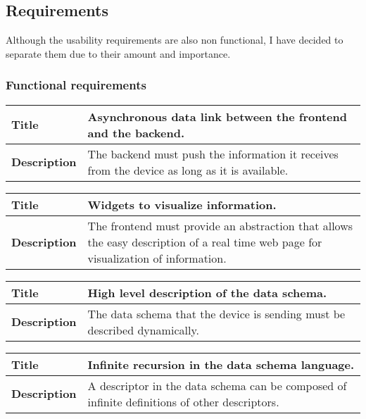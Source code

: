 \documentclass[12pt]{article}
\begin{document}
        \subsection{Requirements}
            Although the usability requirements are also non functional, I have
            decided to separate them due to their amount and importance.

            \subsubsection{Functional requirements}
                \setlength{\parindent}{0cm}
                \begin{tabularx}{\textwidth}{|l|X|}
                    \hline
                    \textbf{Title} & Asynchronous data link between the frontend
                    and the backend. \\
                    \hline
                    \textbf{Description} & The backend must push the information
                    it receives from the device as long as it is available. \\
                    \hline
                \end{tabularx}

                \begin{tabularx}{\textwidth}{|l|X|}
                    \hline
                    \textbf{Title} & Widgets to visualize information. \\
                    \hline
                    \textbf{Description} & The frontend must provide an
                    abstraction that allows the easy description of a real time
                    web page for visualization of information. \\
                    \hline
                \end{tabularx}

                \begin{tabularx}{\textwidth}{|l|X|}
                    \hline
                    \textbf{Title} & High level description of the data schema.\\
                    \hline
                    \textbf{Description} & The data schema that the device is
                    sending must be described dynamically. \\
                    \hline
                \end{tabularx}

                \begin{tabularx}{\textwidth}{|l|X|}
                    \hline
                    \textbf{Title} & Infinite recursion in the data schema
                    language. \\
                    \hline
                    \textbf{Description} & A descriptor in the data schema can
                    be composed of infinite definitions of other descriptors. \\
                    \hline
                \end{tabularx}
\end{document}
